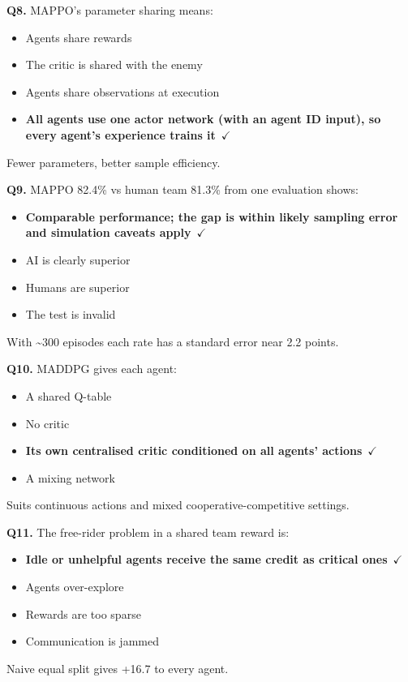 \documentclass[11pt]{article}
\begin{document}
{\noindent\textbf{Q8.} MAPPO's parameter sharing means:\begin{itemize}[leftmargin=2.2em,itemsep=0pt,topsep=1pt]\item[A.] Agents share rewards\item[B.] The critic is shared with the enemy\item[C.] Agents share observations at execution\item[\textbf{D.}] \textbf{All agents use one actor network (with an agent ID input), so every agent's experience trains it}~{\color{GrnN}$\checkmark$}\end{itemize} Fewer parameters, better sample efficiency.\par\medskip

\noindent\textbf{Q9.} MAPPO 82.4\% vs human team 81.3\% from one evaluation shows:\begin{itemize}[leftmargin=2.2em,itemsep=0pt,topsep=1pt]\item[\textbf{A.}] \textbf{Comparable performance; the gap is within likely sampling error and simulation caveats apply}~{\color{GrnN}$\checkmark$}\item[B.] AI is clearly superior\item[C.] Humans are superior\item[D.] The test is invalid\end{itemize} With \textasciitilde{}300 episodes each rate has a standard error near 2.2 points.\par\medskip

\noindent\textbf{Q10.} MADDPG gives each agent:\begin{itemize}[leftmargin=2.2em,itemsep=0pt,topsep=1pt]\item[A.] A shared Q-table\item[B.] No critic\item[\textbf{C.}] \textbf{Its own centralised critic conditioned on all agents' actions}~{\color{GrnN}$\checkmark$}\item[D.] A mixing network\end{itemize} Suits continuous actions and mixed cooperative-competitive settings.\par\medskip

\noindent\textbf{Q11.} The free-rider problem in a shared team reward is:\begin{itemize}[leftmargin=2.2em,itemsep=0pt,topsep=1pt]\item[\textbf{A.}] \textbf{Idle or unhelpful agents receive the same credit as critical ones}~{\color{GrnN}$\checkmark$}\item[B.] Agents over-explore\item[C.] Rewards are too sparse\item[D.] Communication is jammed\end{itemize} Naive equal split gives +16.7 to every agent.\par\medskip

}
\end{document}
